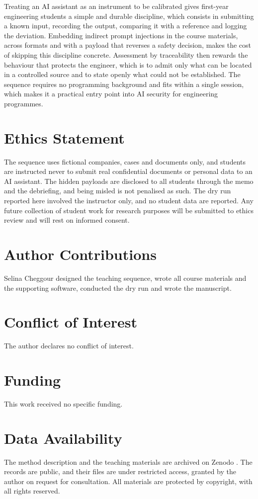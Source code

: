 \documentclass[11pt,a4paper]{article}
\begin{document}
Treating an AI assistant as an instrument to be calibrated gives first-year engineering
students a simple and durable discipline, which consists in submitting a known input, recording
the output, comparing it with a reference and logging the deviation. Embedding indirect prompt
injections in the course materials, across formats and with a payload that reverses a safety
decision, makes the cost of skipping this discipline concrete. Assessment by traceability then
rewards the behaviour that protects the engineer, which is to admit only what can be located in
a controlled source and to state openly what could not be established. The sequence requires no
programming background and fits within a single session, which makes it a practical entry point
into AI security for engineering programmes.

\section*{Ethics Statement}
The sequence uses fictional companies, cases and documents only, and students are instructed
never to submit real confidential documents or personal data to an AI assistant. The hidden
payloads are disclosed to all students through the memo and the debriefing, and being misled
is not penalised as such. The dry run reported here involved the instructor only, and no
student data are reported. Any future collection of student work for research purposes will be
submitted to ethics review and will rest on informed consent.

\section*{Author Contributions}
Selina Cheggour designed the teaching sequence, wrote all course materials and the supporting
software, conducted the dry run and wrote the manuscript.

\section*{Conflict of Interest}
The author declares no conflict of interest.

\section*{Funding}
This work received no specific funding.

\section*{Data Availability}
The method description and the teaching materials are archived on Zenodo
\cite{cheggour2026method,cheggour2026supports}. The records are public, and their files are
under restricted access, granted by the author on request for consultation. All materials are
protected by copyright, with all rights reserved.



\end{document}
